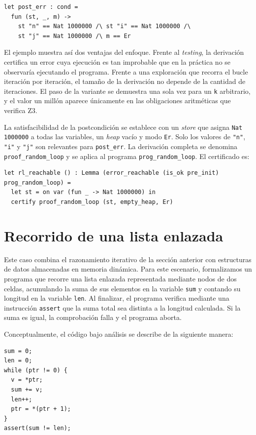 \documentclass[a4paper,	11pt]{report}
\begin{document}
\begin{lstlisting}
let post_err : cond =
  fun (st, _, m) ->
    st "n" == Nat 1000000 /\ st "i" == Nat 1000000 /\
    st "j" == Nat 1000000 /\ m == Er
\end{lstlisting}

El ejemplo muestra así dos ventajas del enfoque.
Frente al \emph{testing},
la derivación certifica un error cuya ejecución es tan improbable que en la práctica no se observaría ejecutando el programa.
Frente a una exploración que recorra el bucle iteración por iteración,
el tamaño de la derivación no depende de la cantidad de iteraciones.
El paso de la variante se demuestra una sola vez para un \lstinline|k| arbitrario,
y el valor un millón aparece únicamente en las obligaciones aritméticas que verifica Z3.

La satisfacibilidad de la postcondición se establece con un \emph{store} que asigna \lstinline|Nat 1000000| a todas las variables,
un \emph{heap} vacío y modo \lstinline|Er|.
Solo los valores de \lstinline|"n"|, \lstinline|"i"| y \lstinline|"j"| son relevantes para \lstinline|post_err|.
La derivación completa se denomina \lstinline|proof_random_loop| y se aplica al programa \lstinline|prog_random_loop|.
El certificado es:

\begin{lstlisting}
let rl_reachable () : Lemma (error_reachable (is_ok pre_init) prog_random_loop) =
  let st = on var (fun _ -> Nat 1000000) in
  certify proof_random_loop (st, empty_heap, Er)
\end{lstlisting}

\section{Recorrido de una lista enlazada}
\label{sec:listas}
Este caso combina el razonamiento iterativo de la sección anterior con estructuras de datos almacenadas en memoria dinámica.
Para este escenario,
formalizamos un programa que recorre una lista enlazada representada mediante nodos de dos celdas,
acumulando la suma de sus elementos en la variable \lstinline|sum| y contando su longitud en la variable \lstinline|len|.
Al finalizar,
el programa verifica mediante una instrucción \lstinline|assert| que la suma total sea distinta a la longitud calculada.
Si la suma es igual,
la comprobación falla y el programa aborta.

Conceptualmente,
el código bajo análisis se describe de la siguiente manera:

\begin{lstlisting}
sum = 0;
len = 0;
while (ptr != 0) {
  v = *ptr;
  sum += v;
  len++;
  ptr = *(ptr + 1);
}
assert(sum != len);
\end{lstlisting}
\end{document}
